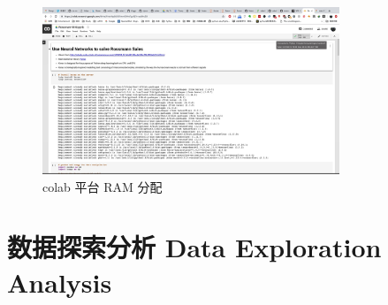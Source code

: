 \documentclass[a4paper]{article}
\begin{document}
\begin{figure}[ht]
 \centering
 \includegraphics[height=5cm]{images/colab-ram.jpg}
 \caption{colab 平台 RAM 分配}
 \label{fig:colab}
\end{figure}


\newpage
\section{数据探索分析 Data Exploration Analysis}\label{sub:eda}
\end{document}
